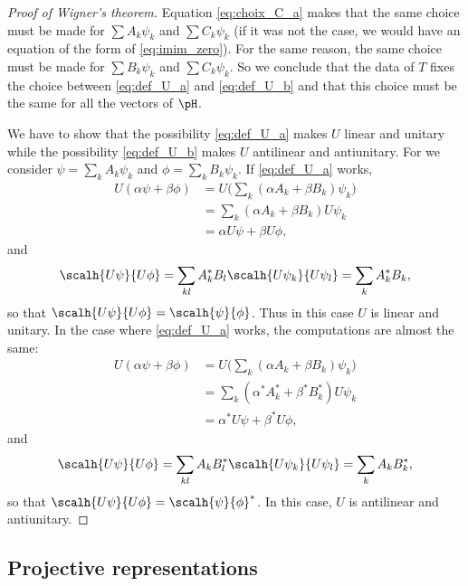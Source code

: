 \begin{proof}[Proof of Wigner's theorem]
Equation \eqref{eq:choix_C_a} makes that the same choice must be made for $\sum A_k\psi_k$ and $\sum C_k\psi_k$ (if it was not the case, we would have an equation of the form of \eqref{eq:imim_zero}). For the same reason, the same choice must be made for $\sum B_k\psi_k$ and $\sum C_k\psi_k$. So we conclude that the data of $T$ fixes the choice between \eqref{eq:def_U_a} and \eqref{eq:def_U_b} and that this choice must be the same for all the vectors of $\pH$.

We have to show that the possibility \eqref{eq:def_U_a} makes $U$ linear and unitary while the possibility \eqref{eq:def_U_b} makes $U$ antilinear and antiunitary. For we consider $\psi=\sum_k A_k\psi_k$ and $\phi=\sum_k B_k\psi_k$. If \eqref{eq:def_U_a} works,
\begin{equation}
\begin{split}
  U(\alpha\psi+\beta\phi)&=U\Big(  \sum_k(\alpha A_k+\beta B_k)\psi_k     \Big)\\
                         &=\sum_k(\alpha A_k+\beta B_k)U\psi_k\\
			 &=\alpha U\psi+\beta U\phi,
\end{split}
\end{equation}
and
\begin{equation}
\scalh{U\psi}{U\phi}=\sum_{kl}A^*_kB_l\scalh{U\psi_k}{U\psi_l}=\sum_kA^*_kB_k,
\end{equation}
so that $\scalh{U\psi}{U\phi}=\scalh{\psi}{\phi}$. Thus in this case $U$ is linear and unitary. In the case where \eqref{eq:def_U_a} works, the computations are almost the same:
\begin{equation}
\begin{split}
  U(\alpha\psi+\beta\phi)&=U\Big(  \sum_k(\alpha A_k+\beta B_k)\psi_k     \Big)\\
                         &=\sum_k(\alpha^* A_k^*+\beta^* B^*_k)U\psi_k\\
			 &=\alpha^* U\psi+\beta^* U\phi,
\end{split}
\end{equation}
and
\begin{equation}
\scalh{U\psi}{U\phi}=\sum_{kl}A_kB^*_l\scalh{U\psi_k}{U\psi_l}=\sum_kA_kB^*_k,
\end{equation}
so that $\scalh{U\psi}{U\phi}=\scalh{\psi}{\phi}^*$. In this case, $U$ is antilinear and antiunitary.

\end{proof}

\subsection{Projective representations}


